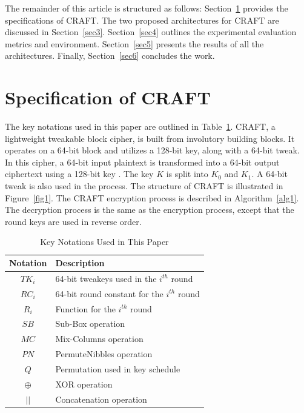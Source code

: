 \documentclass[final,5p,times,twocolumn]{elsarticle}
\begin{document}
The remainder of this article is structured as follows: Section~\ref{sec2} provides the specifications of CRAFT. The two proposed architectures for CRAFT are discussed in Section~\ref{sec3}. Section~\ref{sec4} outlines the experimental evaluation metrics and environment. Section~\ref{sec5} presents the results of all the architectures. Finally, Section~\ref{sec6} concludes the work.

\section{Specification of CRAFT}\label{sec2}

The key notations used in this paper are outlined in Table~\ref{tab1}.
CRAFT, a lightweight tweakable block cipher, is built from involutory building blocks. It operates on a 64-bit block and utilizes a 128-bit key, along with a 64-bit tweak. In this cipher, a 64-bit input plaintext is transformed into a 64-bit output ciphertext  using a 128-bit key . The key $K$ is split into $K_0$ and $K_1$. A 64-bit tweak  is also used in the process. The structure of CRAFT is illustrated in Figure~\ref{fig1}. The CRAFT encryption process is described in Algorithm~\ref{alg1}. The decryption process is the same as the encryption process, except that the round keys are used in reverse order.


\begin{table}[h]
    \centering
    \caption{Key Notations Used in This Paper}\label{tab1}%
    \begin{tabular}{|c|l|}
        \hline
        Notation & Description                                  \\
        \hline
        $TK_i$   & 64-bit tweakeys used in the $i^{th}$ round   \\
        $RC_i$   & 64-bit round constant for the $i^{th}$ round \\
        $R_i$    & Function for the $i^{th}$ round              \\
        $SB$     & Sub-Box operation                            \\
        $MC$     & Mix-Columns operation                        \\
        $PN$     & PermuteNibbles operation                     \\
        $Q$      & Permutation used in key schedule             \\
        $\oplus$ & XOR operation                                \\
        $||$     & Concatenation operation                      \\
        \hline
    \end{tabular}
\end{table}
\end{document}
